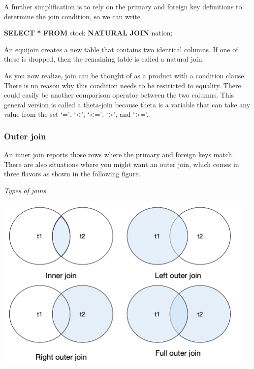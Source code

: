 \documentclass[
]{article}
\newenvironment{Shaded}{\begin{snugshade}}{\end{snugshade}}
\newcommand{\KeywordTok}[1]{\textcolor[rgb]{0.13,0.29,0.53}{\textbf{#1}}}
\newcommand{\NormalTok}[1]{#1}
\newcommand{\OperatorTok}[1]{\textcolor[rgb]{0.81,0.36,0.00}{\textbf{#1}}}
\begin{document}
A further simplification is to rely on the primary and foreign key
definitions to determine the join condition, so we can write

\begin{Shaded}
\begin{Highlighting}[]
\KeywordTok{SELECT} \OperatorTok{*} \KeywordTok{FROM}\NormalTok{ stock }\KeywordTok{NATURAL} \KeywordTok{JOIN}\NormalTok{ nation;}
\end{Highlighting}
\end{Shaded}

An equijoin creates a new table that contains two identical columns. If
one of these is dropped, then the remaining table is called a natural
join.

As you now realize, join can be thought of as a product with a condition
clause. There is no reason why this condition needs to be restricted to
equality. There could easily be another comparison operator between the
two columns. This general version is called a theta-join because theta
is a variable that can take any value from the set `=', `\textless{}',
`\textless=', `\textgreater{}', and `\textgreater='.

\hypertarget{outer-join}{%
\subsubsection*{Outer join}\label{outer-join}}

An inner join reports those rows where the primary and foreign keys
match. There are also situations where you might want an outer join,
which comes in three flavors as shown in the following figure.

\emph{Types of joins}

\includegraphics{Figures/Chapter 10/joins.png}
\end{document}
